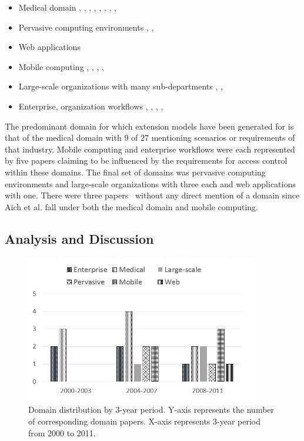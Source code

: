 \begin{itemize}
\setlength{\itemsep}{0.25pt}
\item Medical domain \cite{alam06:constraint}, \cite{tzelepi01:flexible}, \cite{motta03:contextual}, \cite{ni2010privacy}, \cite{damiani2007geo}, \cite{hansen2003spatial}, \cite{samuel07:spatio-temporal}, \cite{aich09:role}, \cite{zhou2007team}
\item Pervasive computing environments \cite{huang06:pervasive}, \cite{chen08:spatio-temporal}, \cite{ray07:spatio}
\item Web applications \cite{masoumzadeh2008purbac}
\item Mobile computing \cite{thein2011leveraging}, \cite{zou2009crbac}, \cite{chandran05:llt}, \cite{ray07:spatio}, \cite{aich09:role}
\item Large-scale organizations with many sub-departments \cite{yamazaki04:designing}, \cite{han08:extended}, \cite{yao2008task}
\item Enterprise, organization workflows \cite{cholewka00:acontext-sensitive}, \cite{bao08:role}, \cite{zhang06:collaborative}, \cite{oh2003task}, \cite{joshi05:generalized}
\end{itemize}

The predominant domain for which extension models have been generated for is that of the medical domain with 9 of 27 mentioning scenarios or requirements of that industry.
Mobile computing and enterprise workflows were each represented by five papers claiming to be influenced by the requirements for access control within these domains. The final set
of domains was pervasive computing environments and large-scale organizations with three each and web applications with one.  There were three papers~\cite{jian2008extended, aich07:STARBAC, haibo2005context} without any direct mention of a domain since Aich et al. \cite{aich09:role} fall under both the medical domain and mobile computing.

\subsection{Analysis and Discussion}

\begin{figure}[ht]
    \centering
        \includegraphics[width=4.0in]{sections/dist_domains_byYear.png}
\vspace{-0.2 in}
    \caption{\label{fig:dist_domains}Domain distribution by 3-year period. Y-axis represents the number of corresponding domain papers.
    X-axis represents 3-year period from 2000 to 2011.}
\end{figure}


